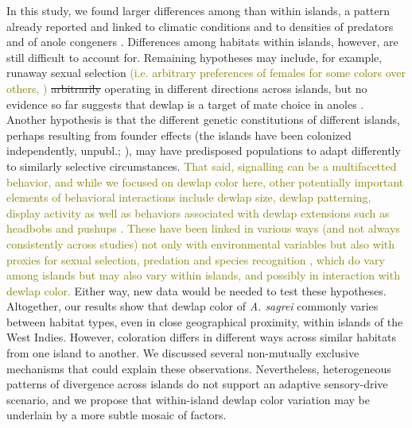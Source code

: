 In this study, we found larger differences among than within islands, a pattern already reported and linked to climatic conditions \citep{Driessens2017} and to densities of predators and of anole congeners \citep{Vanhooydonck2009, Baeckens2018}. Differences among habitats within islands, however, are still difficult to account for. Remaining hypotheses may include, for example, runaway sexual selection \textcolor{olive}{(i.e. arbitrary preferences of females for some colors over others, \citealt{Andersson1994})} \sout{arbitrarily} operating in different directions across islands, but no evidence so far suggests that dewlap is a target of mate choice in anoles \citep{Tokarz2002, Tokarz2005, Lailvaux2006, Nicholson2007}. Another hypothesis is that the different genetic constitutions of different islands, perhaps resulting from founder effects (the islands have been colonized independently, \citealt{vandeSchoot2016} unpubl.; \citealt{Driessens2017, Reynolds2020}), may have predisposed populations to adapt differently to similarly selective circumstances. \textcolor{olive}{That said, signalling can be a multifacetted behavior, and while we focused on dewlap color here, other potentially important elements of behavioral interactions include dewlap size, dewlap patterning, display activity as well as behaviors associated with dewlap extensions such as headbobs and pushups \citep{Vanhooydonck2005, Driessens2014, Driessens2015, Lailvaux2015}. These have been linked in various ways (and not always consistently across studies) not only with environmental variables but also with proxies for sexual selection, predation and species recognition \citep{Vanhooydonck2005, Lailvaux2007, Vanhooydonck2009, Driessens2017, Baeckens2018}, which do vary among islands but may also vary within islands, and possibly in interaction with dewlap color.} Either way, new data would be needed to test these hypotheses.\\

Altogether, our results show that dewlap color of \textit{A. sagrei} commonly varies between habitat types, even in close geographical proximity, within islands of the West Indies. However, coloration differs in different ways across similar habitats from one island to another. We discussed several non-mutually exclusive mechanisms that could explain these observations. Nevertheless, heterogeneous patterns of divergence across islands do not support an adaptive sensory-drive scenario, and we propose that within-island dewlap color variation may be underlain by a more subtle mosaic of factors.